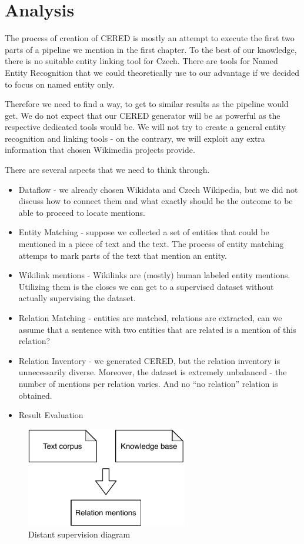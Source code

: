 \section{Analysis}

The process of creation of CERED is mostly an attempt to execute the first two parts of a pipeline we mention in the first chapter. To the best of our knowledge, there is no suitable entity linking tool for Czech. There are tools for Named Entity Recognition that we could theoretically use to our advantage if we decided to focus on named entity only.

Therefore we need to find a way, to get to similar results as the pipeline would get. We do not expect that our CERED generator will be as powerful as the respective dedicated tools would be. We will not try to create a general entity recognition and linking tools - on the contrary, we will exploit any extra information that chosen Wikimedia projects provide.

There are several aspects that we need to think through.
\begin{itemize}
 \item  Dataflow - we already chosen Wikidata and Czech Wikipedia, but we did not discuss how to connect them and what exactly should be the outcome to be able to proceed to locate mentions.
 \item  Entity Matching - suppose we collected a set of entities that could be mentioned in a piece of text and the text. The process of entity matching attemps to mark parts of the text that mention an entity.
 \item  Wikilink mentions - Wikilinks are (mostly) human labeled entity mentions. Utilizing them is the closes we can get to a supervised dataset without actually supervising the dataset.
 \item  Relation Matching - entities are matched, relations are extracted, can we assume that a sentence with two entities that are related is a mention of this relation? 
\item Relation Inventory - we generated CERED, but the relation inventory is unnecessarily diverse. Moreover, the dataset is extremely unbalanced - the number of mentions per relation varies. And no “no relation” relation is obtained. 
 \item  Result Evaluation
\end{itemize}



\begin{figure}[h]\centering
\includegraphics[width=70mm]{./img//Diplomka diagramy-Distant supervision}
\caption{Distant supervision diagram}
\label{obr03:Nhust}
\end{figure}

